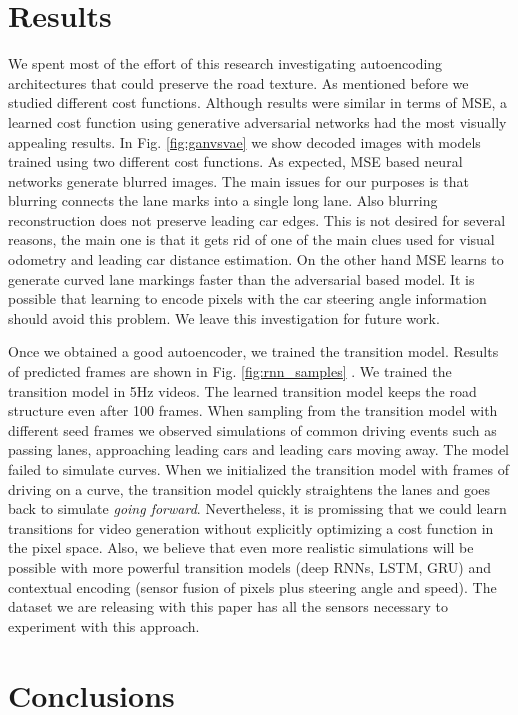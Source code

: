 \documentclass{article} %
\begin{document}
\section{Results}
\label{sec:exp}
We spent most of the effort of this research investigating autoencoding architectures that could preserve the road texture. As mentioned before we studied different
cost functions. Although results were similar in terms of MSE, a learned cost function using generative adversarial networks had the most visually appealing results.
In Fig. \ref{fig:ganvsvae} we show
decoded images with models trained using two different cost functions. As expected, MSE based neural networks generate blurred images. The main issues
for our purposes is that blurring connects the lane marks into a single long lane. Also blurring reconstruction does not preserve leading car edges.
This is not desired for several reasons, the main one is that
it gets rid of one of the main clues used for visual odometry and leading car distance estimation. On the other hand MSE learns to generate curved lane
markings faster than the adversarial based model.
It is possible that learning to encode pixels with the car steering angle information should avoid this problem. We leave this investigation for future work.

Once we obtained a good autoencoder, we trained the transition model. Results of predicted frames are shown in Fig. \ref{fig:rnn_samples} .
We trained the transition model in 5Hz videos. The learned transition model keeps the road structure even after 100 frames.
When sampling from the transition model with different seed frames
we observed simulations of common driving events
such as passing lanes, approaching leading cars and leading cars moving away. The model failed to simulate curves. When we initialized the transition model with frames
of driving on a curve, the transition model quickly straightens the lanes and goes back to simulate \textit{going forward}.
Nevertheless, it is promissing that we could learn transitions for video generation without explicitly optimizing a cost function in the pixel space.
Also, we believe that even more realistic simulations will be possible with
more powerful transition models (deep RNNs, LSTM, GRU) and contextual encoding (sensor fusion of pixels plus steering angle and speed).
The dataset we are releasing with this paper has all the sensors necessary to experiment with this approach.

\section{Conclusions}
\label{sec:conclusions}
\end{document}
